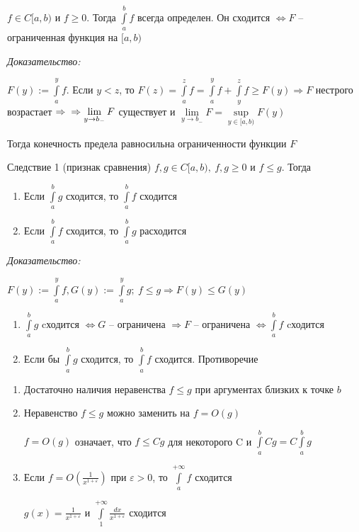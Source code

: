 \documentclass[12pt]{article}
\begin{document}
\begin{theo}{}
    $f \in C[a, b)$ и $f \geq 0$. Тогда $\int\limits_a^b f$ всегда определен. Он сходится $\Leftrightarrow F$ -- ограниченная функция на $[a, b)$
\end{theo}

\textit{Доказательство:}

$F(y) := \int\limits_a^y f$. Если $y < z$, то $F(z) = \int\limits_a^z f = \int\limits_a^y f + \int\limits_y^z f \geq F(y) \Rightarrow F$ нестрого возрастает $\Rightarrow \\
\Rightarrow \lim\limits_{y \to b_-} F$ существует и $\lim\limits_{y \to b_-} F = \sup\limits_{y \in [a, b)} F(y)$

Тогда конечность предела равносильна ограниченности функции $F$

\begin{theo}{Следствие 1 (признак сравнения)}
    $f, g \in C[a, b),\ f, g \geq 0$ и $f \leq g$. Тогда
     
    \begin{enumerate}
        \item Если $\int\limits_a^b g$ сходится, то $\int\limits_a^b f$ сходится
        \item Если $\int\limits_a^b f$ сходится, то $\int\limits_a^b g$ расходится
    \end{enumerate}
\end{theo}

\textit{Доказательство:}

$F(y) := \int\limits_a^y f, G(y) := \int\limits_a^y g;\ f \leq g \Rightarrow F(y) \leq G(y)$

\begin{enumerate}
    \item $\int\limits_a^b g$ cходится $\Leftrightarrow G$ -- ограничена $\Rightarrow F$ -- ограничена $\Leftrightarrow \int\limits_a^b f$ cходится
    \item Если бы $\int\limits_a^b g$ сходится, то $\int\limits_a^b f$ сходится. Противоречие
\end{enumerate}

\begin{Remark}{}
    \begin{enumerate}
        \item Достаточно наличия неравенства $f \leq g$ при аргументах близких к точке $b$
        \item Неравенство $f \leq g$ можно заменить на $f = O(g)$
        
        $f = O(g)$ означает, что $f \leq Cg$ для некоторого C и $\int\limits_a^b Cg = C\int\limits_a^b g$

        \item Если $f = O(\frac{1}{x^{1 + \varepsilon}})$ при $\varepsilon > 0$, то $\int\limits_a^{+ \infty} f$ сходится
        
        $g(x) = \frac{1}{x^{1 + \varepsilon}}$ и $\int\limits_1^{+ \infty} \frac{dx}{x^{1 + \varepsilon}}$ сходится 
    \end{enumerate}
\end{Remark}
\end{document}
